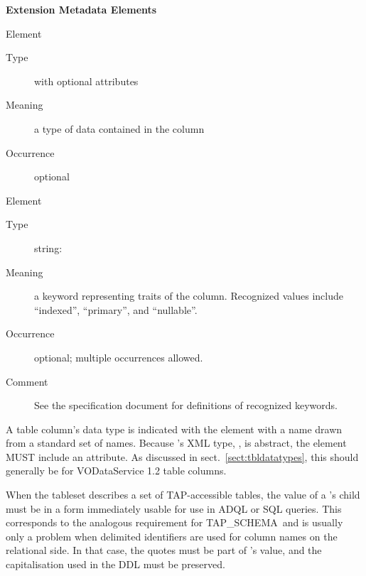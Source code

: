 \documentclass[11pt,a4paper]{ivoa}
\newcommand{\tapschema}{TAP\_SCHE\-MA}
\newcommand{\tapschema}{\mbox{%
  TAP\discretionary{-}{}{\kern-2pt\_}SCHEMA}}
\begin{document}
\begin{generated}
\vspace{0.5ex}\noindent\textbf{ Extension Metadata Elements}

\begingroup\small\begin{bigdescription}\item[Element \xmlel{dataType}]
\begin{description}
\item[Type]  with optional attributes
\item[Meaning] 
                        a type of data contained in the column
                     
\item[Occurrence] optional

\end{description}
\item[Element \xmlel{flag}]
\begin{description}
\item[Type] string: 
\item[Meaning] 
                        a keyword representing traits of the column.  
                        Recognized values include “indexed”, “primary”, and
                        “nullable”.  
                     
\item[Occurrence] optional; multiple occurrences allowed.
\item[Comment] 
                        See the specification document for definitions 
                        of recognized keywords.
                     

\end{description}


\end{bigdescription}\endgroup

\endgroup
\end{generated}



A table column's data type is indicated with the 
element with a name drawn from a standard set of names.  
Because 's
XML type, , is abstract, the
element MUST include an
 attribute.  As discussed in
sect.~\ref{sect:tbldatatypes}, this should generally be
 for VODataService 1.2 table columns.

When the tableset describes a set of TAP-accessible tables, the value of
a 's  child must be in a form immediately
usable for use in ADQL or SQL queries. This corresponds to the analogous
requirement for \tapschema\ and is usually only a problem when delimited
identifiers are used for column names on the relational side.  In that
case, the quotes must be part of 's value, and the
capitalisation used in the DDL must be preserved.
\end{document}
